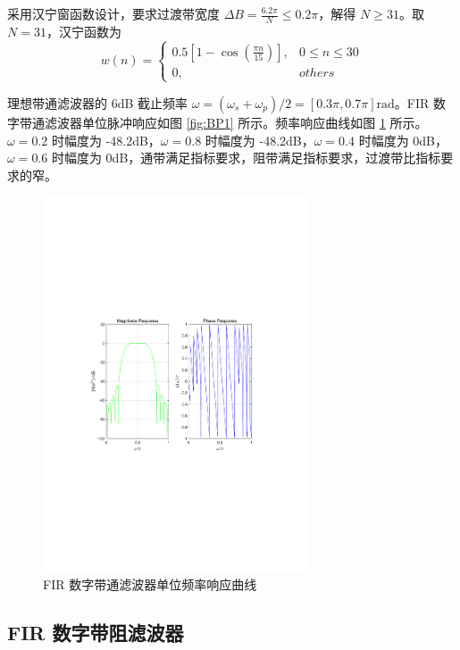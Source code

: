 \documentclass[12pt,AutoFakeBold]{article}
\begin{document}
采用汉宁窗函数设计，要求过渡带宽度 $\Delta B=\frac{6.2\pi}{N}\le 0.2\pi$，解得 $N\ge31$。取 $N=31$，汉宁函数为
%
\begin{equation*}
w(n)=\begin{cases}
0.5\left[ 1 - \cos\left(\frac{\pi n}{15}\right) \right], & 0\le n\le 30 \\
0, & others
\end{cases}
\end{equation*}
%

理想带通滤波器的 6dB 截止频率 $\omega=(\omega_s+\omega_p)/2=[0.3\pi,0.7\pi]\mathrm{rad}$。FIR 数字带通滤波器单位脉冲响应如图 \ref{fig:BP1} 所示。频率响应曲线如图 \ref{fig:BP2} 所示。$\omega=0.2$ 时幅度为 -48.2dB，$\omega=0.8$ 时幅度为 -48.2dB，$\omega=0.4$ 时幅度为 0dB，$\omega=0.6$ 时幅度为 0dB，通带满足指标要求，阻带满足指标要求，过渡带比指标要求的窄。


\begin{figure}[htbp]
	\centering
	\includegraphics[width=0.7\textwidth]{figure/BP2.pdf}
	\caption{FIR 数字带通滤波器单位频率响应曲线} \label{fig:BP2}
\end{figure}

\subsection{FIR 数字带阻滤波器}
\end{document}
